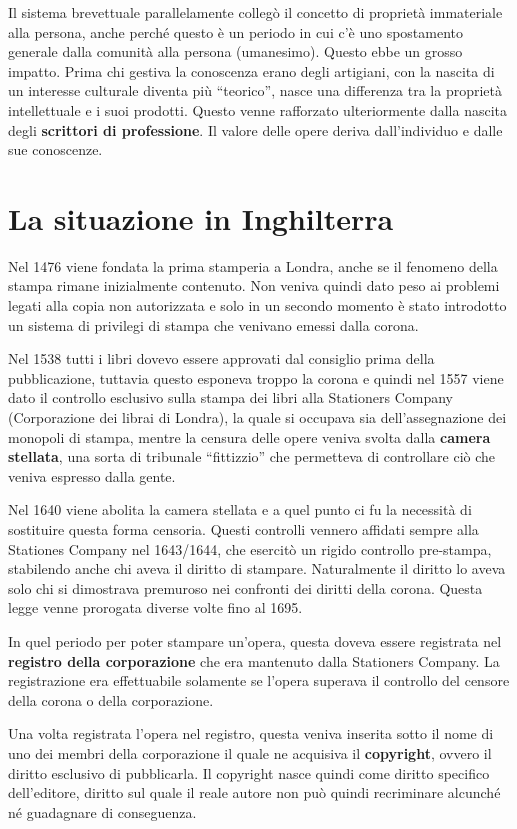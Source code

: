 Il sistema brevettuale parallelamente collegò il concetto di proprietà immateriale alla persona, anche perché questo è un periodo in cui c'è uno spostamento generale dalla comunità alla persona (umanesimo). Questo ebbe un grosso impatto. Prima chi gestiva la conoscenza erano degli artigiani, con la nascita di un interesse culturale diventa più ``teorico'', nasce una differenza tra la proprietà intellettuale e i suoi prodotti. Questo venne rafforzato ulteriormente dalla nascita degli \textbf{scrittori di professione}. Il valore delle opere deriva dall'individuo e dalle sue conoscenze.

\section{La situazione in Inghilterra}

Nel 1476 viene fondata la prima stamperia a Londra, anche se il fenomeno della stampa rimane inizialmente contenuto. Non veniva quindi dato peso ai problemi legati alla copia non autorizzata e solo in un secondo momento è stato introdotto un sistema di privilegi di stampa che venivano emessi dalla corona. 

Nel 1538 tutti i libri dovevo essere approvati dal consiglio prima della pubblicazione, tuttavia questo esponeva troppo la corona e quindi nel 1557 viene dato il controllo esclusivo sulla stampa dei libri alla Stationers Company (Corporazione dei librai di Londra), la quale si occupava sia dell'assegnazione dei monopoli di stampa, mentre la censura delle opere veniva svolta dalla \textbf{camera stellata}, una sorta di tribunale ``fittizzio'' che permetteva di controllare ciò che veniva espresso dalla gente.

Nel 1640 viene abolita la camera stellata e a quel punto ci fu la necessità di sostituire questa forma censoria. Questi controlli vennero affidati sempre alla Stationes Company nel 1643/1644, che esercitò un rigido controllo pre-stampa, stabilendo anche chi aveva il diritto di stampare. Naturalmente il diritto lo aveva solo chi si dimostrava premuroso nei confronti dei diritti della corona. Questa legge venne prorogata diverse volte fino al 1695. 

In quel periodo per poter stampare un'opera, questa doveva essere registrata nel \textbf{registro della corporazione} che era mantenuto dalla Stationers Company. La registrazione era effettuabile solamente se l'opera superava il controllo del censore della corona o della corporazione.

Una volta registrata l'opera nel registro, questa veniva inserita sotto il nome di uno dei membri della corporazione il quale ne acquisiva il \textbf{copyright}, ovvero il diritto esclusivo di pubblicarla.
Il copyright nasce quindi come diritto specifico dell'editore, diritto sul quale il reale autore non può quindi recriminare alcunché né guadagnare di conseguenza.

